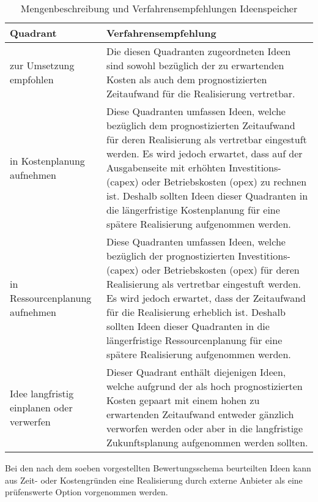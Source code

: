 \documentclass[../../main.tex]{subfiles}
\begin{document}
\sloppy 
\begin{table}[H]
\tablefontsize	
\centering
\caption{Mengenbeschreibung und Verfahrensempfehlungen Ideenspeicher}
\label{Verfahrensmöglichkeiten mit Ideen aus Ideenspeicher}
\begin{tabular}{ |p{4.5cm}|p{12.0cm}|}

\hline
\tableheaderbgcolor
\textbf{Quadrant} & \textbf{Verfahrensempfehlung}\\ 
\hline

zur Umsetzung empfohlen & Die diesen Quadranten zugeordneten Ideen sind sowohl bezüglich der zu erwartenden Kosten als auch dem prognostizierten Zeitaufwand für die Realisierung vertretbar.\\
\hline

in Kostenplanung aufnehmen & Diese Quadranten umfassen Ideen, welche bezüglich dem prognostizierten Zeitaufwand für deren Realisierung als vertretbar eingestuft werden. Es wird jedoch erwartet, dass auf der Ausgabenseite mit erhöhten Investitions- (\acrshort{capex}) oder Betriebskosten (\acrshort{opex}) zu rechnen ist. Deshalb sollten Ideen dieser Quadranten in die längerfristige Kostenplanung für eine spätere Realisierung aufgenommen werden.\\
\hline

in Ressourcenplanung aufnehmen & Diese Quadranten umfassen Ideen, welche bezüglich der prognostizierten Investitions- (\acrshort{capex}) oder Betriebskosten (\acrshort{opex}) für deren Realisierung als vertretbar eingestuft werden. Es wird jedoch erwartet, dass der Zeitaufwand für die Realisierung erheblich ist. Deshalb sollten Ideen dieser Quadranten in die längerfristige Ressourcenplanung für eine spätere Realisierung aufgenommen werden.\\
\hline

Idee langfristig einplanen \newline oder verwerfen & Dieser Quadrant enthält diejenigen Ideen, welche aufgrund der als hoch prognostizierten Kosten gepaart mit einem hohen zu erwartenden Zeitaufwand entweder gänzlich verworfen werden oder aber in die langfristige Zukunftsplanung aufgenommen werden sollten.\\
\hline

\end{tabular}
\end{table}

\begin{sloppypar}
Bei den nach dem soeben vorgestellten Bewertungsschema beurteilten Ideen kann aus Zeit- oder Kostengründen eine Realisierung durch externe Anbieter als eine prüfenswerte Option vorgenommen werden.
\end{sloppypar}
\end{document}
